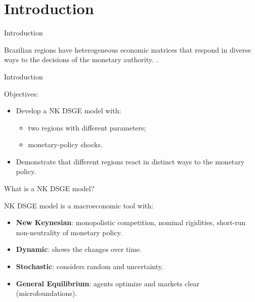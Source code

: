\documentclass[
presentation.tex
]{subfiles}
\begin{document}
	
\section{Introduction}


\begin{frame}{Introduction}
	
	Brazilian regions have heterogeneous economic matrices that respond in diverse ways to the decisions of the monetary authority. \cite{bertanha_efeitos_2008}.		
	
\end{frame}


\begin{frame}{Introduction}

	Objectives:
	
	\begin{itemize}
		
		\item Develop a NK DSGE model with:
			
			\begin{itemize}
				\item two regions with different parameters;
				\item monetary-policy shocks.
			\end{itemize}
		
		\item Demonstrate that different regions react in distinct ways to the monetary policy.
		
	\end{itemize}

\end{frame}


\begin{frame}{What is a NK DSGE model?}
	
	NK DSGE model is a macroeconomic tool with:
	
	\begin{itemize}
		
		\item \textbf{New Keynesian}: monopolistic competition, nominal rigidities, short-run non-neutrality of monetary policy.
		
		\item \textbf{Dynamic}: shows the changes over time.
		
		\item \textbf{Stochastic}: considers random and uncertainty.
		
		\item \textbf{General Equilibrium}: agents optimize and markets clear (microfoundations).
		
	\end{itemize}
	
\end{frame}
\end{document}
